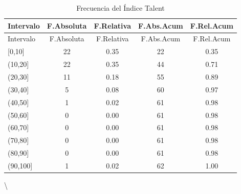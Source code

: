 \documentclass[
]{article}
\begin{document}
\begin{longtable}[]{@{}lcccc@{}}
\caption{Frecuencia del Índice Talent}\tabularnewline
\toprule\noalign{}
Intervalo & F.Absoluta & F.Relativa & F.Abs.Acum & F.Rel.Acum \\
\midrule\noalign{}
\endfirsthead
\toprule\noalign{}
Intervalo & F.Absoluta & F.Relativa & F.Abs.Acum & F.Rel.Acum \\
\midrule\noalign{}
\endhead
\bottomrule\noalign{}
\endlastfoot
{[}0,10{]} & 22 & 0.35 & 22 & 0.35 \\
(10,20{]} & 22 & 0.35 & 44 & 0.71 \\
(20,30{]} & 11 & 0.18 & 55 & 0.89 \\
(30,40{]} & 5 & 0.08 & 60 & 0.97 \\
(40,50{]} & 1 & 0.02 & 61 & 0.98 \\
(50,60{]} & 0 & 0.00 & 61 & 0.98 \\
(60,70{]} & 0 & 0.00 & 61 & 0.98 \\
(70,80{]} & 0 & 0.00 & 61 & 0.98 \\
(80,90{]} & 0 & 0.00 & 61 & 0.98 \\
(90,100{]} & 1 & 0.02 & 62 & 1.00 \\
\end{longtable}

\textbackslash{}
\end{document}
